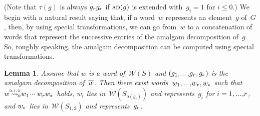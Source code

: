 \documentclass{amsart}
\numberwithin{equation}{section}
\theoremstyle{plain}
\newtheorem{lemm}[prop]{Lemma}
\theoremstyle{definition}
\let\le=\leqslant
\begin{document}
(Note that ${\tau({g})}$ is always ${g}_{r} {{g}_{\hspace{-0.2ex}*\hspace{0.2ex}}}$ if ${{\scriptstyle\mathrm{A\hspace{-0.1ex}D}}({g})}$ is extended with~${g}_{i} = 1$ for ${i} \le 0$.) We begin with a natural result saying that, if a word~${w}$ represents an element~${g}$ of~${G}$, then, by using special transformations, we can go from~${w}$ to a concatenation of words that represent the successive entries of the amalgam decomposition of~${g}$. So, roughly speaking, the amalgam decomposition can be computed using special transformations. 

\begin{lemm}
\label{L:Pieces} 
Assume that ${w}$ is a word of~${\mathcal{W}({S})}$ and $({g}_1 {, ...\hspace{0.2ex},} {g}_{r}, {{g}_{\hspace{-0.2ex}*\hspace{0.2ex}}})$ is the amalgam decomposition of~${\overline{\vrule width0pt height5pt{w}}}$. Then there exist words~${w}_1 {, ...\hspace{0.2ex},} {w}_{r}, {{w}_{\hspace{-0.1ex}*\hspace{0.2ex}}}$ such that ${w} {\mathrel{{\mathrel{\overset{\scriptscriptstyle 0,1,2}{\rightsquigarrow}}}_{\hspace{-0.9ex}{\scriptscriptstyle R}}}} {w}_1 {\hspace{0.2ex}{\cdot}{\cdot}{\cdot}\hspace{0.5ex}} {w}_{r} {{w}_{\hspace{-0.1ex}*\hspace{0.2ex}}}$ holds, ${w}_{i}$ lies in~${\mathcal{W}({{S}_{{o({{g}_{i}})}}})}$ and represents~${g}_{i}$ for ${i} = 1 {, ...\hspace{0.2ex},} {r}$, and ${{w}_{\hspace{-0.1ex}*\hspace{0.2ex}}}$ lies in~${\mathcal{W}({{S}_{1,2}})}$ and represents~${{g}_{\hspace{-0.2ex}*\hspace{0.2ex}}}$.
\end{lemm}
\end{document}

